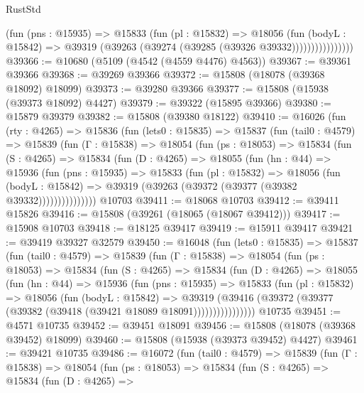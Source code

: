 \begin{lexlean}{RustStd}
\begin{coremodule}
                      (fun (pns : @15935) =>
                      @15833
                        (fun (pl : @15832) =>
                        @18056
                          (fun (bodyL : @15842) =>
                          @39319 (@39263 (@39274 (@39285 (@39326 @39332))))))))))))))))
@39366 := @10680 (@5109 (@4542 (@4559 @4476) @4563))
@39367 := @39361 @39366
@39368 := @39269 @39366
@39372 := @15808 (@18078 (@39368 @18092) @18099)
@39373 := @39280 @39366
@39377 := @15808 (@15938 (@39373 @18092) @4427)
@39379 := @39322 (@15895 @39366)
@39380 := @15879 @39379
@39382 := @15808 (@39380 @18122)
@39410 := @16026
    (fun (rty : @4265) =>
    @15836
      (fun (lets0 : @15835) =>
      @15837
        (fun (tail0 : @4579) =>
        @15839
          (fun (Γ : @15838) =>
          @18054
            (fun (ps : @18053) =>
            @15834
              (fun (S : @4265) =>
              @15834
                (fun (D : @4265) =>
                @18055
                  (fun (hn : @44) =>
                  @15936
                    (fun (pns : @15935) =>
                    @15833
                      (fun (pl : @15832) =>
                      @18056
                        (fun (bodyL : @15842) =>
                        @39319 (@39263 (@39372 (@39377 (@39382 @39332)))))))))))))))
    @10703
@39411 := @18068 @10703
@39412 := @39411 @15826
@39416 := @15808 (@39261 (@18065 (@18067 @39412)))
@39417 := @15908 @10703
@39418 := @18125 @39417
@39419 := @15911 @39417
@39421 := @39419 @39327 @32579
@39450 := @16048
    (fun (lets0 : @15835) =>
    @15837
      (fun (tail0 : @4579) =>
      @15839
        (fun (Γ : @15838) =>
        @18054
          (fun (ps : @18053) =>
          @15834
            (fun (S : @4265) =>
            @15834
              (fun (D : @4265) =>
              @18055
                (fun (hn : @44) =>
                @15936
                  (fun (pns : @15935) =>
                  @15833
                    (fun (pl : @15832) =>
                    @18056
                      (fun (bodyL : @15842) =>
                      @39319
                        (@39416
                          (@39372 (@39377 (@39382 (@39418 (@39421 @18089 @18091))))))))))))))))
    @10735
@39451 := @4571 @10735
@39452 := @39451 @18091
@39456 := @15808 (@18078 (@39368 @39452) @18099)
@39460 := @15808 (@15938 (@39373 @39452) @4427)
@39461 := @39421 @10735
@39486 := @16072
    (fun (tail0 : @4579) =>
    @15839
      (fun (Γ : @15838) =>
      @18054
        (fun (ps : @18053) =>
        @15834
          (fun (S : @4265) =>
          @15834
            (fun (D : @4265) =>

\end{coremodule}
\end{lexlean}
